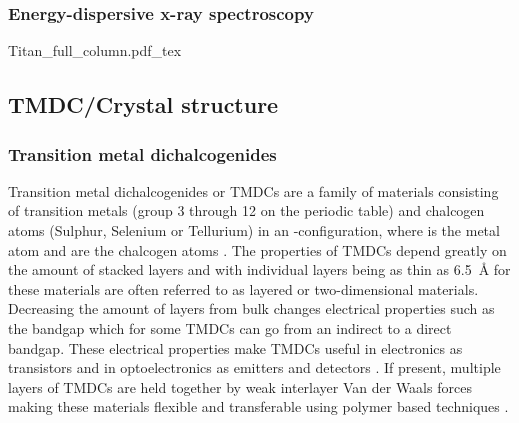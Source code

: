 \subsubsection{Energy-dispersive x-ray spectroscopy}
\begin{minipage}[h]{0.6\linewidth}
        \def\svgwidth{0.66\linewidth}
        {Titan_full_column.pdf_tex}
        \label{fig:tem_crossection}
\end{minipage}


\subsection{TMDC/Crystal structure}
\subsubsection{Transition metal dichalcogenides}
Transition metal dichalcogenides or TMDCs are a family of materials consisting of transition metals (group 3 through 12 on the periodic table) and chalcogen atoms (Sulphur, Selenium or Tellurium) in an -configuration, where  is the metal atom and  are the chalcogen atoms \cite{C7TA04268J}.
The properties of TMDCs depend greatly on the amount of stacked layers and with individual layers being as thin as \SI{6.5}{\angstrom} for  these materials are often referred to as layered or two-dimensional materials.
Decreasing the amount of layers from bulk changes electrical properties such as the bandgap which for some TMDCs can go from an indirect to a direct bandgap.
These electrical properties make TMDCs useful in electronics as transistors and in optoelectronics as emitters and detectors \cite{emerg_photolum, LopezSanchez2013, Radisavljevic2011}. 
If present, multiple layers of TMDCs are held together by weak interlayer Van der Waals forces making these materials flexible and transferable using polymer based techniques \cite{reganEmergingExcitonPhysics2022a}.

